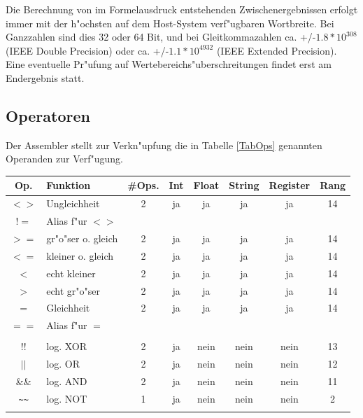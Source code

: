 \documentclass[12pt,a4paper,twoside]{report}
\begin{document}
Die Berechnung von im Formelausdruck entstehenden Zwischenergebnissen
erfolgt immer mit der h"ochsten auf dem Host-System verf"ugbaren Wortbreite.
Bei Ganzzahlen sind dies 32 oder 64 Bit, und bei Gleitkommazahlen
ca. +/-$1.8*10^{308}$ (IEEE Double Precision) oder ca. +/-$1.1*10^{4932}$
(IEEE Extended Precision).  Eine eventuelle Pr"ufung auf
Wertebereichs"uberschreitungen findet erst am Endergebnis statt.

\subsection{Operatoren}

Der Assembler stellt zur Verkn"upfung die in Tabelle \ref{TabOps} genannten
Operanden zur Verf"ugung.
\begin{table}[htbp]
\begin{center}\begin{tabular}{|c|l|c|c|c|c|c|c|}
\hline
Op. & Funktion & \#Ops. & Int & Float & String & Register & Rang \\
\hline
\hline
$<>$        & Ungleichheit         & 2 & ja   & ja   & ja   & ja   & 14 \\
$!=$        & Alias f"ur $<>$      &   &      &      &      &      &    \\
$>=$        & gr"o"ser o. gleich   & 2 & ja   & ja   & ja   & ja   & 14 \\
$<=$        & kleiner o. gleich    & 2 & ja   & ja   & ja   & ja   & 14 \\
$<$         & echt kleiner         & 2 & ja   & ja   & ja   & ja   & 14 \\
$>$         & echt gr"o"ser        & 2 & ja   & ja   & ja   & ja   & 14 \\
$=$         & Gleichheit           & 2 & ja   & ja   & ja   & ja   & 14 \\
$==$        & Alias f"ur $=$       &   &      &      &      &      &    \\
            & & & & & &  \\
$!!$        & log. XOR             & 2 & ja   & nein & nein & nein & 13 \\
$||$        & log. OR              & 2 & ja   & nein & nein & nein & 12 \\
\&\&        & log. AND             & 2 & ja   & nein & nein & nein & 11 \\
\verb! ~~ ! & log. NOT             & 1 & ja   & nein & nein & nein & 2 \\
            & & & & & &  \\

\end{tabular}
\end{center}
\end{table}
\end{document}
